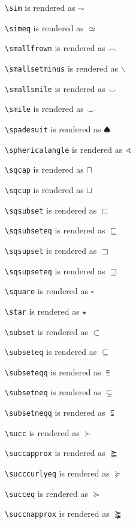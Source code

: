 \texttt{\textbackslash sim} is rendered as $\sim$

\texttt{\textbackslash simeq} is rendered as $\simeq$

\texttt{\textbackslash smallfrown} is rendered as $\smallfrown$

\texttt{\textbackslash smallsetminus} is rendered as $\smallsetminus$

\texttt{\textbackslash smallsmile} is rendered as $\smallsmile$

\texttt{\textbackslash smile} is rendered as $\smile$

\texttt{\textbackslash spadesuit} is rendered as $\spadesuit$

\texttt{\textbackslash sphericalangle} is rendered as $\sphericalangle$

\texttt{\textbackslash sqcap} is rendered as $\sqcap$

\texttt{\textbackslash sqcup} is rendered as $\sqcup$

\texttt{\textbackslash sqsubset} is rendered as $\sqsubset$

\texttt{\textbackslash sqsubseteq} is rendered as $\sqsubseteq$

\texttt{\textbackslash sqsupset} is rendered as $\sqsupset$

\texttt{\textbackslash sqsupseteq} is rendered as $\sqsupseteq$

\texttt{\textbackslash square} is rendered as $\square$

\texttt{\textbackslash star} is rendered as $\star$

\texttt{\textbackslash subset} is rendered as $\subset$

\texttt{\textbackslash subseteq} is rendered as $\subseteq$

\texttt{\textbackslash subseteqq} is rendered as $\subseteqq$

\texttt{\textbackslash subsetneq} is rendered as $\subsetneq$

\texttt{\textbackslash subsetneqq} is rendered as $\subsetneqq$

\texttt{\textbackslash succ} is rendered as $\succ$

\texttt{\textbackslash succapprox} is rendered as $\succapprox$

\texttt{\textbackslash succcurlyeq} is rendered as $\succcurlyeq$

\texttt{\textbackslash succeq} is rendered as $\succeq$

\texttt{\textbackslash succnapprox} is rendered as $\succnapprox$

